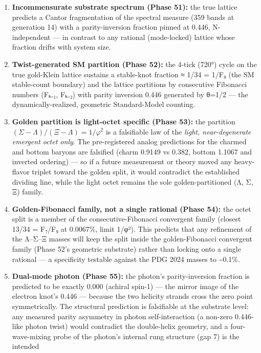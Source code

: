 \documentclass[
]{article}
\begin{document}
\begin{enumerate}
  future refinement of the proton or electron mass measurements.
\item
  \textbf{Incommensurate substrate spectrum (Phase 51):} the true
  lattice predicts a Cantor fragmentation of the spectral measure (359
  bands at generation 14) with a parity-inversion fraction pinned at
  0.446, N-independent --- in contrast to any rational (mode-locked)
  lattice whose fraction drifts with system size.
\item
  \textbf{Twist-generated SM partition (Phase 52):} the 4-tick (720°)
  cycle on the true gold-Klein lattice sustains a stable-knot fraction ≈
  1/34 = 1/F₉ (the SM stable-count boundary) and the lattice partitions
  by consecutive Fibonacci numbers (Fₖ₋₁, Fₖ₋₂) with parity inversion
  0.446 generated by θ=1/2 --- the dynamically-realized, geometric
  Standard-Model counting.
\item
  \textbf{Golden partition is light-octet specific (Phase 53):} the
  partition \((\Sigma-\Lambda)/(\Xi-\Lambda) = 1/\varphi^2\) is a
  falsifiable law of the \emph{light, near-degenerate emergent octet
  only}. The pre-registered analog predictions for the charmed and
  bottom baryons are falsified (charm 0.9149 vs 0.382, bottom 1.1067 and
  inverted ordering) --- so if a future measurement or theory moved any
  heavy-flavor triplet toward the golden split, it would contradict the
  established dividing line, while the light octet remains the sole
  golden-partitioned (Λ, Σ, Ξ) family.
\item
  \textbf{Golden-Fibonacci family, not a single rational (Phase 54):}
  the octet split is a member of the consecutive-Fibonacci convergent
  family (closest 13/34 = F₇/F₉ at 0.0067\%, limit 1/φ²). This predicts
  that any refinement of the Λ--Σ--Ξ masses will keep the split inside
  the golden-Fibonacci convergent family (Phase 52's geometric
  substrate) rather than locking onto a single rational --- a
  specificity testable against the PDG 2024 masses to
  \textasciitilde0.1\%.
\item
  \textbf{Dual-mode photon (Phase 55):} the photon's parity-inversion
  fraction is predicted to be exactly 0.000 (achiral spin-1) --- the
  mirror image of the electron knot's 0.446 --- because the two helicity
  strands cross the zero point symmetrically. The structural prediction
  is falsifiable at the substrate level: any measured parity asymmetry
  in photon self-interaction (a non-zero 0.446-like photon twist) would
  contradict the double-helix geometry, and a four-wave-mixing probe of
  the photon's internal rung structure (gap 7) is the intended

\end{enumerate}
\end{document}

